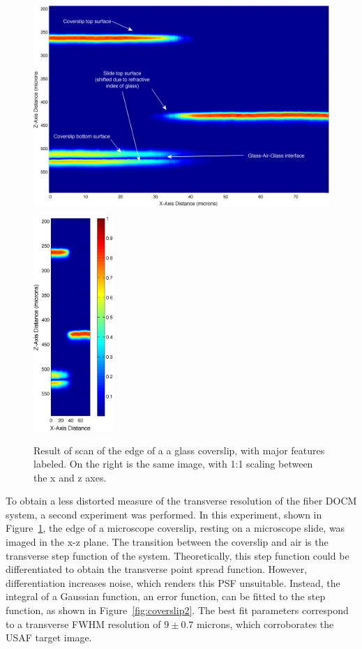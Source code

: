 \begin{figure}[h!]
\centering
\includegraphics[height=230pt]{Images/Results/coverslip_ann.png}
\includegraphics[height=230pt]{Images/Results/coverslip_equal.png}
\caption[Result of scan of the edge of a a glass coverslip.]{Result of scan of the edge of a a glass coverslip, with major features labeled. On the right is the same image, with 1:1 scaling between the x and z axes.\label{fig:coverslip1}}
\end{figure}

To obtain a less distorted measure of the transverse resolution of the fiber DOCM system, a second experiment was performed. In this experiment, shown in Figure~\ref{fig:coverslip1}, the edge of a microscope coverslip, resting on a microscope slide, was imaged in the x-z plane. The transition between the coverslip and air is the transverse step function of the system. Theoretically, this step function could be differentiated to obtain the transverse point spread function. However, differentiation increases noise, which renders this PSF unsuitable. Instead, the integral of a Gaussian function, an error function, can be fitted to the step function, as shown in Figure~\ref{fig:coverslip2}. The best fit parameters correspond to a transverse FWHM resolution of $9 \pm 0.7$ microns, which corroborates the USAF target image.


